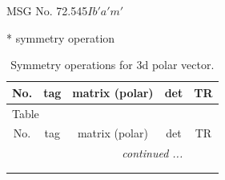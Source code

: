\documentclass[fleqn,8pt]{jsarticle}
\begin{document}
\setcounter{MaxMatrixCols}{32}

\renewcommand{\tablename}{Table~}
\renewcommand{\figurename}{Figure~}
\begin{center}
\LARGE
MSG No. 72.545\quad$Ib'a'm'$
\end{center}
* symmetry operation
\renewcommand{\arraystretch}{1.3}
\begin{longtable}{ccccc}
\caption{Symmetry operations for 3d polar vector.}
 \\
 \hline \hline
No. & tag & matrix (polar) & det & TR \\ \hline \endfirsthead

\multicolumn{4}{l}{\tablename\ \thetable{}} \\
 \hline \hline
No. & tag & matrix (polar) & det & TR \\ \hline \endhead

 \hline \hline
\multicolumn{4}{r}{\footnotesize\it continued ...} \\ \endfoot

 \hline \hline
\multicolumn{4}{r}{} \\ \endlastfoot


\end{longtable}
\end{document}
